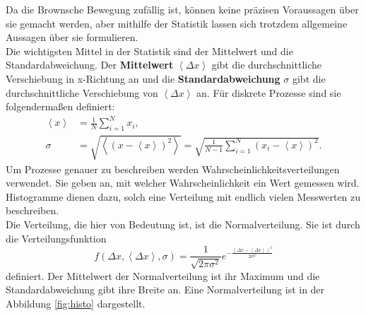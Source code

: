 \documentclass[a4paper, 12pt]{scrartcl}
\newcommand{\mean}[1]{\left< #1 \right>}
\begin{document}
Da die Brownsche Bewegung zufällig ist, können keine präzisen Voraussagen über sie gemacht werden, aber mithilfe der Statistik lassen sich trotzdem allgemeine Aussagen über sie formulieren.\\
Die wichtigsten Mittel in der Statistik sind der Mittelwert und die Standardabweichung. Der \textbf{Mittelwert} $\mean{\Delta x}$ gibt die durchschnittliche Verschiebung in x-Richtung an und die \textbf{Standardabweichung} $\sigma$ gibt die durchschnittliche Verschiebung von $\mean{\Delta x}$ an. Für diskrete Prozesse sind sie folgendermaßen definiert:
\begin{align}
  \mean{x} & = \frac{1}{N} \sum_{i=1}^{N} x_i, \\
  \sigma & = \sqrt{\mean{ {\left( x - \mean{x} \right)}^2 }} = \sqrt{\frac{1}{N - 1} \sum_{i=1}^{N} {\left( x_i - \mean{x} \right)}^2}.
\end{align}
Um Prozesse genauer zu beschreiben werden Wahrscheinlichkeitsverteilungen verwendet. Sie geben an, mit welcher Wahrscheinlichkeit ein Wert gemessen wird. Histogramme dienen dazu, solch eine Verteilung mit endlich vielen Messwerten zu beschreiben.\\
Die Verteilung, die hier von Bedeutung ist, ist die Normalverteilung. Sie ist durch die Verteilungsfunktion
\begin{equation}
  f(\Delta x, \mean{\Delta x}, \sigma) = \frac{1}{\sqrt{2 \pi \sigma^2}} e^{- \frac{(\Delta x - \mean{\Delta x})^2}{2 \sigma^2}} \label{eq:gauss}
\end{equation}
definiert. Der Mittelwert der Normalverteilung ist ihr Maximum und die Standardabweichung gibt ihre Breite an. Eine Normalverteilung ist in der Abbildung \ref{fig:histo} dargestellt.\\
\end{document}

